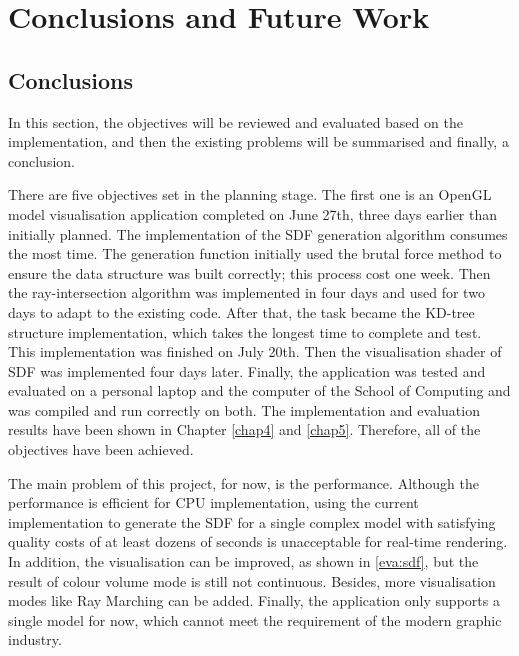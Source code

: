 \chapter{Conclusions and Future Work}

\section{Conclusions}

In this section, the objectives will be reviewed and evaluated based on the implementation, and then the existing problems will be summarised and finally, a conclusion.

\hspace*{\fill}

There are five objectives set in the planning stage. The first one is an OpenGL model visualisation application completed on June 27th, three days earlier than initially planned. The implementation of the SDF generation algorithm consumes the most time. The generation function initially used the brutal force method to ensure the data structure was built correctly; this process cost one week. Then the ray-intersection algorithm was implemented in four days and used for two days to adapt to the existing code. After that, the task became the KD-tree structure implementation, which takes the longest time to complete and test. This implementation was finished on July 20th. Then the visualisation shader of SDF was implemented four days later. Finally, the application was tested and evaluated on a personal laptop and the computer of the School of Computing and was compiled and run correctly on both. The implementation and evaluation results have been shown in Chapter \ref{chap4} and \ref{chap5}. Therefore, all of the objectives have been achieved.

\hspace*{\fill}

The main problem of this project, for now, is the performance. Although the performance is efficient for CPU implementation, using the current implementation to generate the SDF for a single complex model with satisfying quality costs of at least dozens of seconds is unacceptable for real-time rendering. In addition, the visualisation can be improved, as shown in \ref{eva:sdf}, but the result of colour volume mode is still not continuous. Besides, more visualisation modes like Ray Marching can be added. Finally, the application only supports a single model for now, which cannot meet the requirement of the modern graphic industry.

